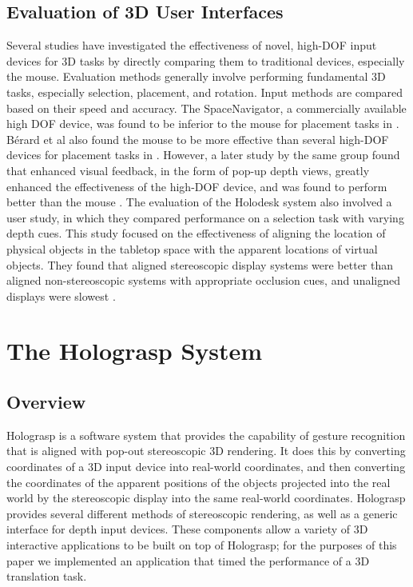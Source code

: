 \documentclass[pageno]{jpaper}
\begin{document}
\subsection{Evaluation of 3D User Interfaces}
Several studies have investigated the effectiveness of novel, high-DOF input devices for 3D tasks by directly comparing them to traditional devices, especially the mouse.
Evaluation methods generally involve performing fundamental 3D tasks, especially selection, placement, and rotation. Input methods are compared based on their
speed and accuracy. The SpaceNavigator, a commercially available high DOF device, was found to be inferior to the mouse for placement tasks in
\cite{mattheiss2011navigating}. B{\'e}rard et al also found the mouse to be more effective than several high-DOF devices for placement tasks
in \cite{study1}.  However, a later study by the same group found that enhanced visual feedback, in the form of pop-up depth views, greatly enhanced the effectiveness
of the high-DOF device, and was found to perform better than the mouse \cite{study2}. The
evaluation of the Holodesk system also involved a user study, in which they compared performance on a selection task with varying depth cues. This study focused on
the effectiveness of aligning the location of physical objects in the tabletop space with the apparent locations of virtual objects. They found that aligned
stereoscopic display systems were better than aligned non-stereoscopic systems with appropriate occlusion cues, and unaligned displays were slowest \cite{holodesk}.
\section{The Holograsp System}
\subsection{Overview}
Holograsp is a software system that provides the capability of gesture recognition that is aligned with pop-out stereoscopic 3D rendering. 
It does this by converting coordinates of a 3D input device into real-world coordinates, and then converting the coordinates of the
apparent positions of the objects projected into the real world by the stereoscopic display into the same real-world coordinates. 
Holograsp provides several different methods of stereoscopic rendering, as well as
a generic interface for depth input devices. These components allow a variety of 3D interactive applications to be built on top of Holograsp;
for the purposes of this paper we implemented an application that timed the performance of a 3D translation task.
\end{document}
